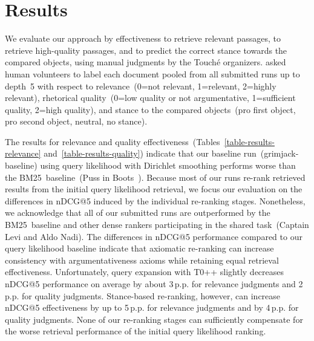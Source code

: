 \section{Results}
\label{results}

We evaluate our approach by effectiveness to retrieve relevant passages, to retrieve high-quality passages, and to predict the correct stance towards the compared objects, using manual judgments by the Touché organizers. \citet{BondarenkoFKSGBPBSWPH2022} asked human volunteers to label each document pooled from all submitted runs up to depth~5 with respect to relevance~(0=not relevant, 1=relevant, 2=highly relevant), rhetorical quality~(0=low quality or not argumentative, 1=sufficient quality, 2=high quality), and stance to the compared objects~(pro first object, pro second object, neutral, no stance).



The results for relevance and quality effectiveness~(Tables~\ref{table-results-relevance} and~\ref{table-results-quality}) indicate that our baseline run~(grimjack-baseline) using query likelihood with Dirichlet smoothing performs worse than the BM25~baseline~(Puss in Boots~\cite{BondarenkoFKSGBPBSWPH2022}). Because most of our runs re-rank retrieved results from the initial query likelihood retrieval, we focus our evaluation on the differences in nDCG@5 induced by the individual re-ranking stages. Nonetheless, we acknowledge that all of our submitted runs are outperformed by the BM25~baseline and other dense rankers participating in the shared task~(Captain Levi and Aldo Nadi).
The differences in nDCG@5 performance compared to our query likelihood baseline indicate that axiomatic re-ranking can increase consistency with argumentativeness axioms while retaining equal retrieval effectiveness. Unfortunately, query expansion with T0++ slightly decreases nDCG@5 performance on average by about 3\,p.p. for relevance judgments and 2\,p.p. for quality judgments. Stance-based re-ranking, however, can increase nDCG@5 effectiveness by up to 5\,p.p. for relevance judgments and by 4\,p.p. for quality judgments. None of our re-ranking stages can sufficiently compensate for the worse retrieval performance of the initial query likelihood ranking.

